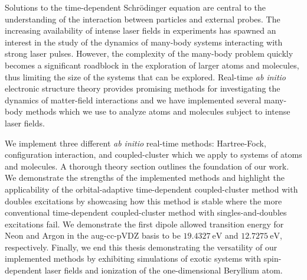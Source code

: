 Solutions to the time-dependent Schrödinger equation are central to the
understanding of the interaction between particles and external probes.
The increasing availability of intense laser fields in experiments has spawned
an interest in the study of the dynamics of many-body systems interacting with
strong laser pulses.
However, the complexity of the many-body problem quickly becomes a significant
roadblock in the exploration of larger atoms and molecules, thus limiting the
size of the systems that can be explored.
Real-time \textit{ab initio} electronic structure theory provides promising
methods for investigating the dynamics of matter-field interactions and we have
implemented several many-body methods which we use to analyze atoms and
molecules subject to intense laser fields.

We implement three different \textit{ab initio} real-time methods:
Hartree-Fock, configuration interaction, and coupled-cluster which we apply to
systems of atoms and molecules.
A thorough theory section outlines the foundation of our work.
We demonstrate the strengths of the implemented methods and highlight the
applicability of the orbital-adaptive time-dependent coupled-cluster method with
doubles excitations by showcasing how this method is stable where the more
conventional time-dependent coupled-cluster method with singles-and-doubles
excitations fail.
We demonstrate the first dipole allowed transition energy for Neon and Argon in
the aug-cc-pVDZ basis to be $\SI{19.4327}{\electronvolt}$ and
$\SI{12.7275}{\electronvolt}$, respectively.
Finally, we end this thesis demonstrating the versatility of our implemented
methods by exhibiting simulations of exotic systems with spin-dependent laser
fields and ionization of the one-dimensional Beryllium atom.
